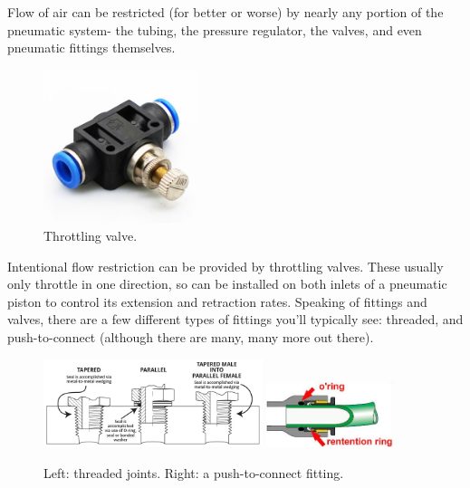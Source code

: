 \documentclass[10pt,letterpaper]{book}
\begin{document}
Flow of air can be restricted (for better or worse) by nearly any portion of the pneumatic system- the tubing, the pressure regulator, the valves, and even pneumatic fittings themselves.

\begin{figure}[H]
	\includegraphics[width=0.4\textwidth]{imgs/pneumatic_throttle.jpeg}
	\caption{Throttling valve.}
\end{figure}

Intentional flow restriction can be provided by throttling valves. These usually only throttle in one direction, so can be installed on both inlets of a pneumatic piston to control its extension and retraction rates. Speaking of fittings and valves, there are a few different types of fittings you'll typically see: threaded, and push-to-connect (although there are many, many more out there).

\begin{figure}[H]
	\includegraphics[width=0.57\textwidth]{imgs/taper_vs_parallel_threads.jpeg}
	\qquad
	\includegraphics[width=0.33\textwidth]{imgs/push_to_connect_fitting.png}
	\caption{Left: threaded joints. Right: a push-to-connect fitting.}
\end{figure}
\end{document}
